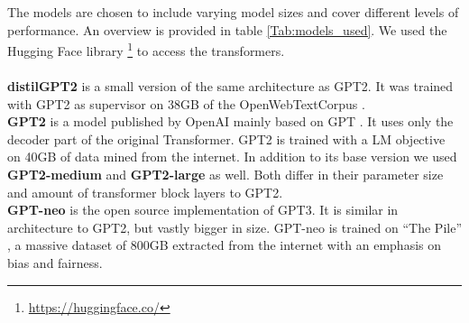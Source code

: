 The models are chosen to include varying model sizes and cover different levels of performance.
An overview is provided in table \ref{Tab:models_used}. We used the Hugging Face library \parencite{wolf_transformers_2020}\footnote{\url{https://huggingface.co/}} to access the transformers.\\
\\
\textbf{distilGPT2} is a small version of the same architecture as GPT2. It was trained with GPT2 as supervisor on 38GB of the OpenWebTextCorpus \parencite{gokaslan_openwebtext_2019}. \\
\textbf{GPT2} is a model published by OpenAI mainly based on GPT \parencite{radford_language_2019}.
It uses only the decoder part of the original Transformer.
GPT2 is trained with a LM objective on 40GB of data mined from the internet.
In addition to its base version we used \textbf{GPT2-medium} and \textbf{GPT2-large} as well.
Both differ in their parameter size and amount of transformer block layers to GPT2.\\
\textbf{GPT-neo} is the open source implementation of GPT3.
It is similar in architecture to GPT2, but vastly bigger in size.
GPT-neo is trained on ``The Pile'' \parencite{gao_pile_2020}, a massive dataset of 800GB extracted from the internet with an emphasis on bias and fairness.\\

